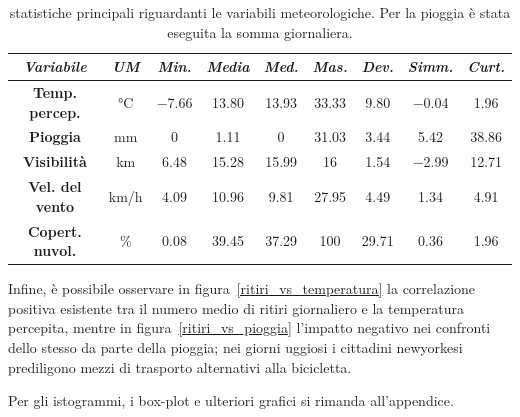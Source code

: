 \begin{table}[htp]
	\centering
	\renewcommand\arraystretch{1.5}
	\begin{tabular}{c|c|c|c|c|c|c|c|c}
		\hline
		\textit{Variabile} & \textit{UM} & \textit{Min.} & \textit{Media} & \textit{Med.} & \textit{Mas.} & \textit{Dev.} & \textit{Simm.}  & \textit{Curt.} \\
		\hline
		\textbf{Temp. percep.} & \unit{\degreeCelsius} & \num{-7.66} & \num{13.80} & \num{13.93} & \num{33.33} & \num{9.80} & \num{-0.04} & \num{1.96} \\
		\hline
		\textbf{Pioggia} & \unit{\milli\meter} & \num{0} & \num{1.11} & \num{0} & \num{31.03} & \num{3.44} & \num{5.42} & \num{38.86} \\
		\hline
		\textbf{Visibilità} & \si{\kilo\meter} & \num{6.48} & \num{15.28} & \num{15.99} & \num{16} & \num{1.54} & \num{-2.99} & \num{12.71} \\
		\hline
		\textbf{Vel. del vento} & \si{\kilo\meter/\hour} & \num{4.09} & \num{10.96} & \num{9.81} & \num{27.95} & \num{4.49} & \num{1.34} & \num{4.91} \\
		\hline
		\textbf{Copert. nuvol.} & \si{\percent} & \num{0.08} & \num{39.45} & \num{37.29} & \num{100} & \num{29.71} & \num{0.36} & \num{1.96} \\
		\hline
	\end{tabular}
	\caption[Statistiche principali riguardanti le variabili meteorologiche]{statistiche principali riguardanti le variabili meteorologiche. Per la pioggia è stata eseguita la somma giornaliera.}
	\label{statistiche_variabili_meteo}
\end{table}

\par Infine, è possibile osservare in figura~\ref{ritiri_vs_temperatura} la correlazione positiva esistente tra il numero medio di ritiri giornaliero e la temperatura percepita, mentre in figura~\ref{ritiri_vs_pioggia} l'impatto negativo nei confronti dello stesso da parte della pioggia; nei giorni uggiosi i cittadini newyorkesi prediligono mezzi di trasporto alternativi alla bicicletta.
\par Per gli istogrammi, i box-plot e ulteriori grafici si rimanda all'appendice.

